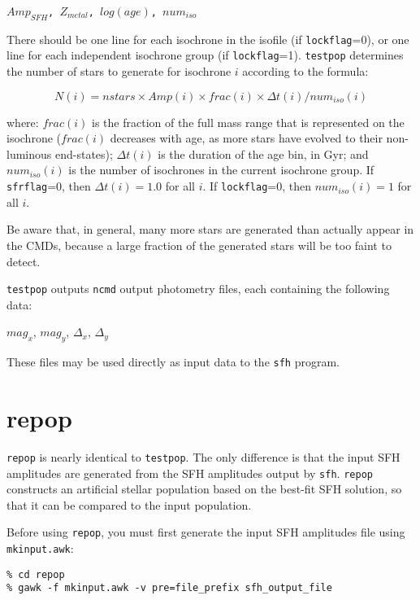 \documentclass[12pt]{book}
\def\ttg{\tt\color{DarkGreen}}
\def\tto{\tt\color{myOrange}}
\begin{document}
\medskip
\noindent
{\ttg $Amp_{SFH}$, $Z_{metal}$, $log(age)$, $num_{iso}$}

\medskip
\noindent
There should be one line for each isochrone in the isofile (if 
{\tto lockflag}=0), or one line for each independent isochrone group 
(if {\tto lockflag}=1).  {\ttg testpop} determines the number of stars 
to generate for isochrone $i$ according to the formula:

$$N(i) = nstars \times Amp(i) \times frac(i) \times \Delta t(i) / num_{iso}(i)$$

\noindent where: $frac(i)$ is the fraction of the full mass range that 
is represented on the isochrone ($frac(i)$ decreases with age, as more 
stars have evolved to their non-luminous end-states); $\Delta t(i)$ is 
the duration of the age bin, in Gyr; and $num_{iso}(i)$ is the number 
of isochrones in the current isochrone group.  If {\tto sfrflag}=0, 
then $\Delta t(i)=1.0$ for all $i$.  If {\tto lockflag}=0, then
$num_{iso}(i)=1$ for all $i$.

Be aware that, in general, many more stars are generated than actually 
appear in the CMDs, because a large fraction of the generated stars 
will be too faint to detect.  

\medskip
\noindent
{\ttg testpop} outputs {\tt ncmd} output photometry files, each 
containing the following data:

\medskip
\noindent
{\ttg $mag_x$},  {\ttg $mag_y$}, {\ttg $\Delta_x$}, {\ttg $\Delta_y$}

\medskip
\noindent
These files may be used directly as input data to the {\ttg sfh} 
program.


\chapter{repop}\label{ch:repop}

\noindent
{\ttg repop} is nearly identical to {\ttg testpop}.  The only 
difference is that the input SFH amplitudes are generated from the SFH 
amplitudes output by {\ttg sfh}.  {\ttg repop} constructs an 
artificial stellar population based on the best-fit SFH solution, so 
that it can be compared to the input population.

Before using {\ttg repop}, you must first generate the input SFH 
amplitudes file using {\ttg mkinput.awk}:

\medskip
\noindent
{\ttg \% cd repop} \\
{\ttg \% gawk -f mkinput.awk -v pre=file\_prefix sfh\_output\_file}
\end{document}
